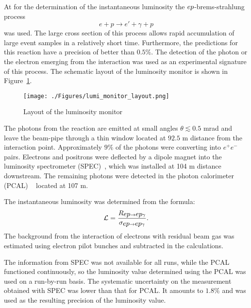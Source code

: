 At \zeus for the determination of the instantaneous luminosity the $\mbox{$e p$}$-brems-strahlung process~\cite{Bethe:1934za}
\begin{equation}
	e + p \rightarrow e' + \gamma + p
\end{equation}
was used. The large cross section of this process allows rapid accumulation of large event samples in a relatively short time. Furthermore, the predictions for this reaction have a precision of better than $0.5\%$. The detection of the photon or the electron emerging from the interaction was used as an experimental signature of this process. The schematic layout of the luminosity monitor is shown in Figure~\ref{fig:lumi_monitor_layout}.
\begin{figure}
	\centering
		\texttt{[image: ./Figures/lumi\_monitor\_layout.png]}
	\caption{Layout of the \zeus luminosity monitor}
	\label{fig:lumi_monitor_layout}
\end{figure}
The photons from the reaction are emitted at small angles $\theta \lesssim 0.5$ mrad and leave the beam-pipe through a thin window located at $92.5$ m distance from the interaction point. Approximately $9\%$ of the photons were converting into $e^+e^-$ pairs. Electrons and positrons were deflected by a dipole magnet into the luminosity spectrometer (SPEC)~\cite{physics-0512153}, which was installed at 104 m distance downstream. The remaining photons were detected in the photon calorimeter (PCAL) ~\cite{desy-92-066,zfp:c63:391,acpp:b32:2025} located at 107 m.

The instantaneous luminosity was determined from the formula:
\begin{equation}
\mathcal{L} = \frac{R_{\mbox{$e p$}\rightarrow \mbox{$e p$}\gamma}}{ \sigma_{\mbox{$e p$}\rightarrow \mbox{$e p$}\gamma}}.
\end{equation}
The background from the interaction of electrons with residual beam gas was estimated using electron pilot bunches and subtracted in the calculations.

The information from SPEC was not available for all runs, while the PCAL functioned continuously, so the luminosity value determined using the PCAL was used on a run-by-run basis. The systematic uncertainty on the measurement obtained with SPEC was lower than that for PCAL. It amounts to $1.8\%$ and was used as the resulting precision of the luminosity value.

